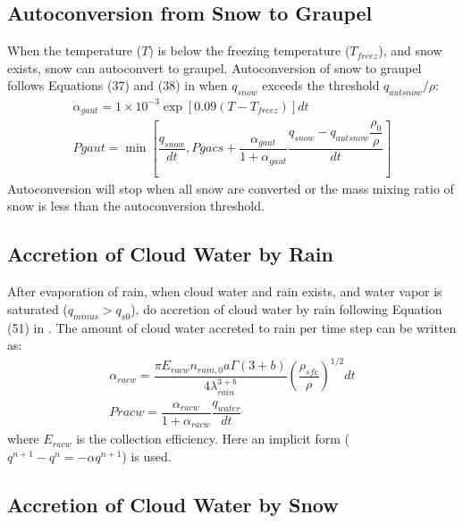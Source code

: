 \documentclass[letterpaper,titlepage,10pt]{article}
\numberwithin{equation}{section}
\begin{document}

\subsection{Autoconversion from Snow to Graupel}

When the temperature ($T$) is below the freezing temperature ($T_{freez}$), and snow exists, snow can autoconvert to graupel. Autoconversion of snow to graupel follows Equations (37) and (38) in \citet{lin1983bulk} when $q_{snow}$ exceeds the threshold $q_{autsnow} / \rho$:
\begin{gather}
	\alpha_{gaut} = 1 \times 10^{-3} \exp \left[0.09 \left(T - T_{freez} \right)  \right] dt \\
	Pgaut = \min \left[\dfrac{q_{snow}}{dt}, Pgacs + \dfrac{\alpha_{gaut}}{1 + \alpha_{gaut}} \dfrac{q_{snow} - q_{autsnow} \dfrac{\rho_0}{\rho}}{dt} \right]
\end{gather}
Autoconversion will stop when all snow are converted or the mass mixing ratio of snow is less than the autoconversion threshold.


\subsection{Accretion of Cloud Water by Rain}

After evaporation of rain, when cloud water and rain exists, and water vapor is saturated ($q_{minus} > q_{s0}$), do accretion of cloud water by rain following Equation (51) in \citet{lin1983bulk}. The amount of cloud water accreted to rain per time step can be written as:
\begin{gather}
	\alpha_{racw} = \dfrac{\pi E_{racw} n_{rain,0} a \Gamma \left(3 + b \right)}{4 \lambda^{3 + b}_{rain}} \left(\dfrac{\rho_{sfc}}{\rho}\right)^{1/2} dt \\
	Pracw = \dfrac{\alpha_{racw}}{1 + \alpha_{racw}} \dfrac{q_{water}}{dt}
\end{gather}
where $E_{racw}$ is the collection efficiency. Here an implicit form ($q^{n+1} - q^{n} = - \alpha q^{n+1}$) is used.


\subsection{Accretion of Cloud Water by Snow}
\end{document}
